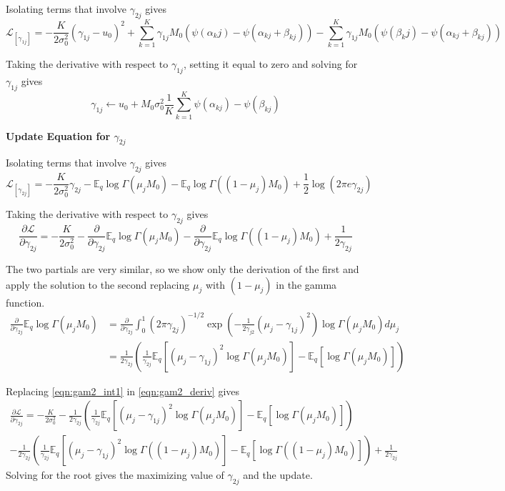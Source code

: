 \documentclass[10pt, letterpaper]{article}
\newcommand{\E}{\mathbb{E}}
\begin{document}
Isolating terms that involve $\gamma_{2j}$ gives
\begin{equation*}
\mathcal{L}_{[\gamma_{1j}]} = -\frac{K}{2\sigma_0^2}(\gamma_{1j}-u_0)^2 
+ \sum_{k=1}^K \gamma_{1j} M_0 ( \psi(\alpha_kj) - \psi(\alpha_{kj} + \beta_{kj}) )
- \sum_{k=1}^K \gamma_{1j} M_0 ( \psi(\beta_kj) - \psi(\alpha_{kj} + \beta_{kj}) )
\end{equation*}

Taking the derivative with respect to $\gamma_{1j}$, setting it equal to zero and solving for $\gamma_{1j}$ gives
\begin{equation}
\gamma_{1j} \leftarrow u_0 + M_0 \sigma_0^2 \frac{1}{K} \sum_{k=1}^K \psi(\alpha_{kj}) - \psi(\beta_{kj})
\end{equation}

{\bf Update Equation for $\gamma_{2j}$ }\label{sec:gamma2_update}

Isolating terms that involve $\gamma_{2j}$ gives
\begin{equation*}
\mathcal{L}_{[\gamma_{2j}]} = -\frac{K}{2\sigma_0^2}\gamma_{2j} -\E_q\log\Gamma(\mu_jM_0) - \E_q\log\Gamma((1-\mu_j)M_0)+\frac{1}{2}\log(2\pi e \gamma_{2j})
\end{equation*}

Taking the derivative with respect to $\gamma_{2j}$ gives
\begin{equation}\label{eqn:gam2_deriv}
\frac{\partial \mathcal{L}}{\partial \gamma_{2j}} = -\frac{K}{2\sigma_0^2} -\frac{\partial}{\partial \gamma_{2j}}\E_q\log\Gamma(\mu_jM_0) -\frac{\partial}{\partial \gamma_{2j}}\E_q\log\Gamma((1-\mu_j)M_0) +\frac{1}{2\gamma_{2j}}
\end{equation}

The two partials are very similar, so we show only the derivation of the first and apply the solution to the second replacing $\mu_j$ with $(1-\mu_j)$ in the gamma function.
\begin{align}\label{eqn:gam2_int1}
\frac{\partial}{\partial \gamma_{2j}}\E_q\log\Gamma(\mu_jM_0) &= \frac{\partial}{\partial \gamma_{2j}} \int_0^1 (2\pi\gamma_{2j})^{-1/2}\exp\left(-\frac{1}{2\gamma_{j2}}(\mu_j-\gamma_{1j})^2\right) \log\Gamma(\mu_jM_0)d\mu_j \\
& = \frac{1}{2\gamma_{2j}}\left(\frac{1}{\gamma_{2j}} \E_q \left[ (\mu_j-\gamma_{1j})^2 \log\Gamma(\mu_jM_0) \right] - \E_q \left[ \log\Gamma(\mu_jM_0) \right] \right)
\end{align}

Replacing \eqref{eqn:gam2_int1} in \eqref{eqn:gam2_deriv} gives
\begin{multline}
\frac{\partial \mathcal{L}}{\partial \gamma_{2j}} = -\frac{K}{2\sigma_0^2} 
- \frac{1}{2\gamma_{2j}}\left(\frac{1}{\gamma_{2j}} \E_q \left[ (\mu_j-\gamma_{1j})^2 \log\Gamma(\mu_jM_0) \right] - \E_q \left[ \log\Gamma(\mu_jM_0) \right] \right) \\
- \frac{1}{2\gamma_{2j}}\left(\frac{1}{\gamma_{2j}} \E_q \left[ (\mu_j-\gamma_{1j})^2 \log\Gamma((1-\mu_j)M_0) \right] - \E_q \left[ \log\Gamma((1-\mu_j)M_0) \right] \right) +\frac{1}{2\gamma_{2j}}
\end{multline}
Solving for the root gives the maximizing value of $\gamma_{2j}$ and the update.
\end{document}
